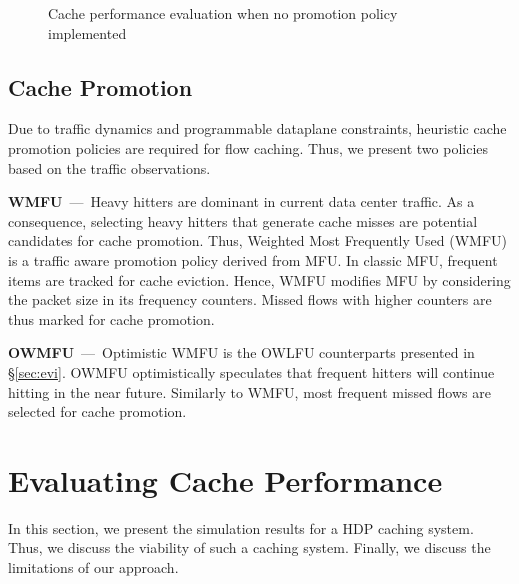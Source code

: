 \begin{figure}[]
{		\label{fig:weighted_hit_ratio_sf10}
	}
	\caption{Cache performance evaluation when no promotion policy implemented}
	\label{fig:hit_ratio}
\end{figure}


\subsection{Cache Promotion}
Due to traffic dynamics and programmable dataplane constraints, heuristic cache promotion policies are required for flow caching.
Thus, we present two policies based on the traffic observations.

\textbf{WMFU}~---~Heavy hitters are dominant in current data center traffic.
As a consequence, selecting heavy hitters that generate cache misses are potential candidates for cache promotion.
Thus, Weighted Most Frequently Used (WMFU) is a traffic aware promotion policy derived from MFU.
In classic MFU, frequent items are tracked for cache eviction.
Hence, WMFU modifies MFU by considering the packet size in its frequency counters.
Missed flows with higher counters are thus marked for cache promotion.

\textbf{OWMFU}~---~Optimistic WMFU is the OWLFU counterparts presented in \S\ref{sec:evi}.
OWMFU optimistically speculates that frequent hitters will continue hitting in the near future.
Similarly to WMFU, most frequent missed flows are selected for cache promotion.



\section{Evaluating Cache Performance}\label{sec:cache_results}
In this section, we present the simulation results for a HDP caching system.
Thus, we discuss the viability of such a caching system.
Finally, we discuss the limitations of our approach.

